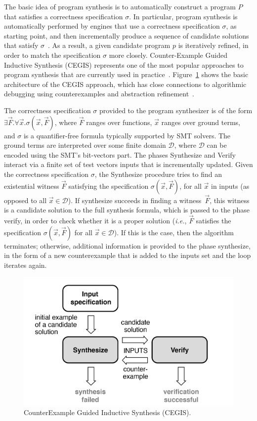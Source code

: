 \documentclass{cta-author}
\begin{document}
The basic idea of program synthesis is to automatically construct a program $P$ that satisfies a correctness specification $\sigma$. In particular, program synthesis is automatically performed by engines that use a correctness specification $\sigma$, as starting point, and then incrementally produce a sequence of candidate solutions that satisfy $\sigma$~\cite{David15,Abate17}. As a result, a given candidate program $p$ is iteratively refined, in order to match the specification $\sigma$ more closely. Counter-Example Guided Inductive Synthesis (CEGIS) represents one of the most popular approaches to program synthesis that are currently used in practice~\cite{David15}. Figure~\ref{Counter-Example-Guided-Inductive-Synthesis} shows the basic architecture of the CEGIS approach, which has close connections to algorithmic debugging using counterexamples and abstraction refinement~\cite{Alur13}. 

The correctness specification $\sigma$ provided to the program synthesizer is of the form $\exists \vec{F} .  \forall \vec{x}.  \sigma(\vec{x}, \vec{F})$, where $\vec{F}$ ranges over functions, $\vec{x}$ ranges over ground terms, and $\sigma$ is a quantifier-free formula typically supported by SMT solvers. The ground terms are interpreted over some finite domain $\mathcal{D}$, where $\mathcal{D}$ can be encoded using the SMT's bit-vectors part. The phases {\sc Synthesize} and {\sc Verify} interact via a finite set of test vectors {\sc inputs} that is incrementally updated. Given the correctness specification $\sigma$, the {\sc Synthesize} procedure tries to find an existential witness $\vec{F}$ satisfying the specification $\sigma(\vec{x}, \vec{F})$, for all $\vec{x}$ in {\sc inputs} (as opposed to all $\vec{x} \in \mathcal{D}$). If {\sc synthesize} succeeds in finding a witness~$\vec{F}$, this witness is a candidate solution to the full synthesis formula, which is passed to the phase {\sc verify}, in order to check whether it is a proper solution ({\it i.e.}, $\vec{F}$ satisfies the specification $\sigma(\vec{x}, \vec{F})$ for all $\vec{x}\in\mathcal{D}$). If this is the case, then the algorithm terminates; otherwise, additional information is provided to the phase {\sc synthesize}, in the form of a new counterexample that is added to the {\sc inputs} set and the loop iterates again. 
%
\begin{figure}[h]
	\centering
	\includegraphics[width=0.7\columnwidth]{figure3.jpg}
	\caption{CounterExample Guided Inductive Synthesis (CEGIS).}
	\label{Counter-Example-Guided-Inductive-Synthesis}
\end{figure}
\end{document}
